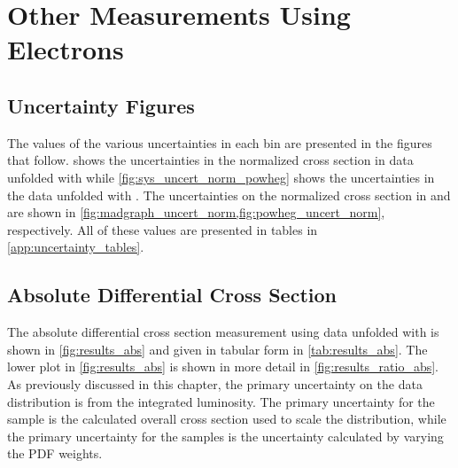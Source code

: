 \chapter{Other Measurements Using \Dressed Electrons}
\label{app:dressed_measurements}

\section{Uncertainty Figures}

The values of the various uncertainties in each \phistar bin are presented in the
figures that follow.  shows the uncertainties in the
normalized \phistar cross section in data unfolded with \MADGRAPH while
\cref{fig:sys_uncert_norm_powheg} shows the uncertainties in the data unfolded
with \PPsixZtwo. The uncertainties on the normalized \phistar cross section in
\MADGRAPH and \POWHEG are shown in
\cref{fig:madgraph_uncert_norm,fig:powheg_uncert_norm}, respectively. All of
these values are presented in tables in \cref{app:uncertainty_tables}.











\section{Absolute Differential Cross Section}
\label{sec:results_abs}

The absolute differential cross section measurement using data unfolded with
\MADGRAPH is shown in \cref{fig:results_abs} and given in tabular form in
\cref{tab:results_abs}. The lower plot in \cref{fig:results_abs} is
shown in more detail in \cref{fig:results_ratio_abs}. As previously
discussed in this chapter, the primary uncertainty on the data distribution is
from the integrated luminosity. The primary uncertainty for the
\MADGRAPH sample is the \FEWZ calculated overall cross section used to scale
the distribution, while the primary uncertainty for the \POWHEG samples is the
uncertainty calculated by varying the \CTten PDF weights.

